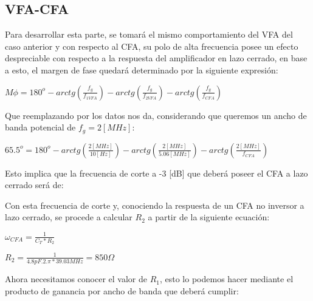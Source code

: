 \newpage
\subsection{VFA-CFA}

    Para desarrollar esta parte, se tomará el mismo comportamiento del VFA del caso anterior y con respecto al CFA, su polo de alta frecuencia posee un efecto despreciable con respecto a la respuesta del amplificador en lazo cerrado, en base a esto, el margen de fase quedará determinado por la siguiente expresión:

    \begin{center}
        $M\phi = 180^o -arctg(\frac{f_g}{f_{1VFA}}) -arctg(\frac{f_g}{f_{2VFA}}) -arctg(\frac{f_g}{f_{CFA}})$
    \end{center}

    Que reemplazando por los datos nos da, considerando que queremos un ancho de banda potencial de $f_g = 2[MHz]$:

    \begin{center}
        $65.5^o = 180^o -arctg(\frac{2[MHz]}{10 [Hz]}) -arctg(\frac{2[MHz]}{5.06 [MHz]}) -arctg(\frac{2[MHz]}{f_{CFA}})$ 
    \end{center}

    Esto implica que la frecuencia de corte a -3 [dB] que deberá poseer el CFA a lazo cerrado será de:

    \begin{center}
    \end{center}

    Con esta frecuencia de corte y, conociendo la respuesta de un CFA no inversor a lazo cerrado, se procede a calcular $R_2$ a partir de la siguiente ecuación:

    \begin{center}
        $\omega_{CFA} = \frac{1}{C_T*R_2}$
    \end{center}

    \begin{center}
        $R_2 = \frac{1}{4.8pF .2.\pi*39.03 MHz} = 850 \Omega$
    \end{center}

    \begin{center}
    \end{center}

    Ahora necesitamos conocer el valor de $R_1$, esto lo podemos hacer mediante el producto de ganancia por ancho de banda que deberá cumplir:

